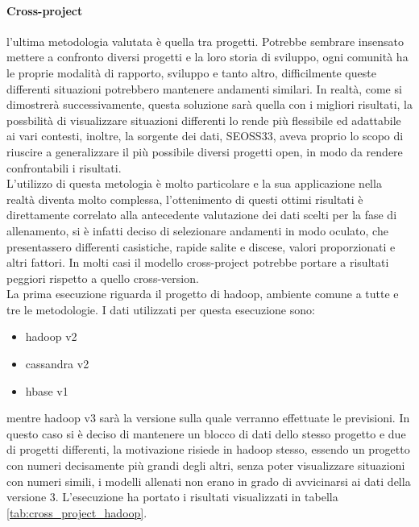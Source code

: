 \documentclass[%
    corpo=12pt,
    twoside,
    oldstyle,
    autoretitolo,
    greek,
    evenboxes,
]{toptesi}
\begin{document}
\paragraph{Cross-project} l'ultima metodologia valutata è quella tra progetti. Potrebbe sembrare insensato mettere a confronto diversi progetti e la loro storia di sviluppo, ogni comunità ha le proprie modalità di rapporto, sviluppo e tanto altro, difficilmente queste differenti situazioni potrebbero mantenere andamenti similari. In realtà, come si dimostrerà successivamente, questa soluzione sarà quella con i migliori risultati, la possbilità di visualizzare situazioni differenti lo rende più flessibile ed adattabile ai vari contesti, inoltre, la sorgente dei dati, SEOSS33, aveva proprio lo scopo di riuscire a generalizzare il più possibile diversi progetti open, in modo da rendere confrontabili i risultati.\\
L'utilizzo di questa metologia è molto particolare e la sua applicazione nella realtà diventa molto complessa, l'ottenimento di questi ottimi risultati è direttamente correlato alla antecedente valutazione dei dati scelti per la fase di allenamento, si è infatti deciso di selezionare andamenti in modo oculato, che presentassero differenti casistiche, rapide salite e discese, valori proporzionati e altri fattori. In molti casi il modello cross-project potrebbe portare a risultati peggiori rispetto a quello cross-version.\\
La prima esecuzione riguarda il progetto di hadoop, ambiente comune a tutte e tre le metodologie. I dati utilizzati per questa esecuzione sono:
\begin{itemize}
  \item hadoop v2
  \item cassandra v2
  \item hbase v1
\end{itemize}
mentre hadoop v3 sarà la versione sulla quale verranno effettuate le previsioni. In questo caso si è deciso di mantenere un blocco di dati dello stesso progetto e due di progetti differenti, la motivazione risiede in hadoop stesso, essendo un progetto con numeri decisamente più grandi degli altri, senza poter visualizzare situazioni con numeri simili, i modelli allenati non erano in grado di avvicinarsi ai dati della versione 3. L'esecuzione ha portato i risultati visualizzati in tabella \ref{tab:cross_project_hadoop}.
\end{document}
